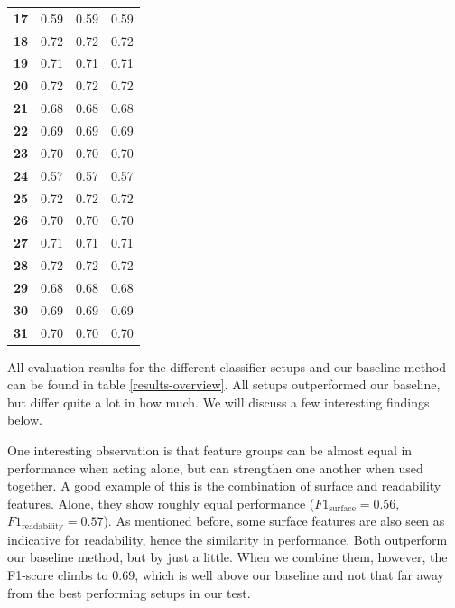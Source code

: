 \documentclass[
10pt, %
a4paper, %
oneside, %
headinclude,footinclude, %
] {book}%
\begin{document}
\begin{table}[]
\begin{tabular}{@{}llll@{}}
\textbf{17}        & 0.59                   & 0.59                & 0.59              \\
\textbf{18}       & 0.72                   & 0.72                & 0.72              \\
\textbf{19}       & 0.71                   & 0.71                & 0.71              \\
\textbf{20}       & 0.72                   & 0.72                & 0.72              \\
\textbf{21}       & 0.68                   & 0.68                & 0.68              \\
\textbf{22}       & 0.69                   & 0.69                & 0.69              \\
\textbf{23}       & 0.70                   & 0.70                & 0.70              \\
\textbf{24}       & 0.57                   & 0.57                & 0.57              \\

\textbf{25}       & 0.72                   & 0.72                & 0.72              \\
\textbf{26}       & 0.70                   & 0.70                & 0.70              \\
\textbf{27}       & 0.71                   & 0.71                & 0.71              \\
\textbf{28}       & 0.72                   & 0.72                & 0.72              \\
\textbf{29}       & 0.68                   & 0.68                & 0.68              \\
\textbf{30}       & 0.69                   & 0.69                & 0.69              \\
\textbf{31}       & 0.70                   & 0.70                & 0.70              \\ \bottomrule
\end{tabular}
\end{table}

All evaluation results for the different classifier setups and our baseline method can be found in table \ref{results-overview}. All setups outperformed our baseline, but differ quite a lot in how much. We will discuss a few interesting findings below.

One interesting observation is that feature groups can be almost equal in performance when acting alone, but can strengthen one another when used together. A good example of this is the combination of surface and readability features. Alone, they show roughly equal performance ($F1_{\text{surface}} = 0.56$,  $F1_{\text{readability}} = 0.57$). As mentioned before, some surface features are also seen as indicative for readability, hence the similarity in performance. Both outperform our baseline method, but by just a little. When we combine them, however, the F1-score climbs to 0.69, which is well above our baseline and not that far away from the best performing setups in our test.
\end{document}
